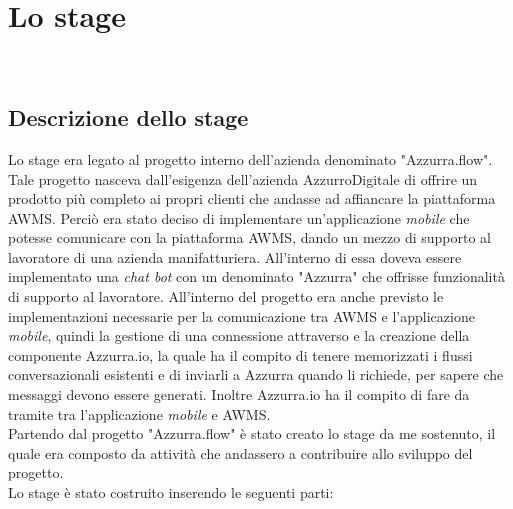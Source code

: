 
\chapter{Lo stage}
\label{cap:descrizione-stage}

\\

\section{Descrizione dello stage}
Lo stage era legato al progetto interno dell'azienda denominato "Azzurra.flow". Tale progetto nasceva dall'esigenza dell'azienda AzzurroDigitale di offrire un prodotto più completo ai propri clienti che andasse ad affiancare la piattaforma \gls{AWMS}. Perciò era stato deciso di implementare un’applicazione \emph{mobile} che potesse comunicare con la piattaforma \gls{AWMS}, dando un mezzo di supporto al lavoratore di una azienda manifatturiera. All'interno di essa doveva essere implementato una \emph{chat bot} con un  denominato "Azzurra" che offrisse funzionalità di supporto al lavoratore. All'interno del progetto era anche previsto le implementazioni necessarie per la comunicazione tra \gls{AWMS} e l'applicazione \emph{mobile}, quindi la gestione di una connessione attraverso  e la creazione della componente Azzurra.io, la quale ha il compito di tenere memorizzati i flussi conversazionali esistenti e di inviarli a Azzurra quando li richiede, per sapere che messaggi devono essere generati. Inoltre Azzurra.io ha il compito di fare da tramite tra l'applicazione \emph{mobile} e \gls{AWMS}.\\
Partendo dal progetto "Azzurra.flow" è stato creato lo stage da me sostenuto, il quale era composto da attività che andassero a contribuire allo sviluppo del progetto. \\
Lo stage è stato costruito inserendo le seguenti parti:

